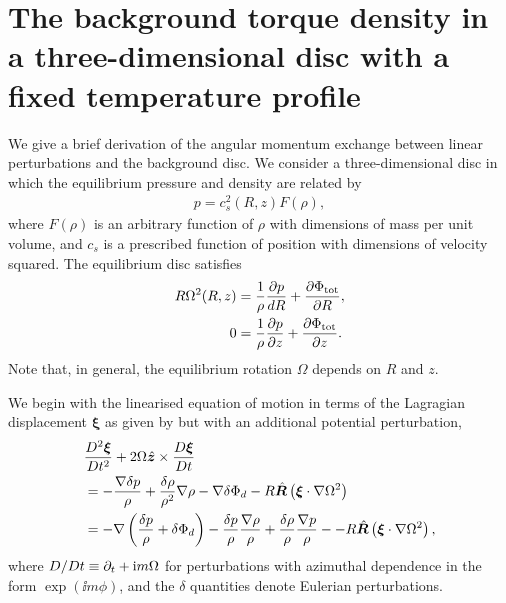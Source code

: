 \section{The background torque density in a three-dimensional disc with
  a fixed temperature profile}\label{tbg_deriv}
We give a brief derivation of the angular momentum exchange between
linear perturbations and the background disc. We consider a
three-dimensional disc in which the equilibrium pressure and density
are related by 
\begin{align}\label{iso_cond}
  p = c_s^2(R,z)F(\rho),
\end{align} 
where $F(\rho)$ is an arbitrary function of $\rho$ with dimensions of
mass per unit volume, and $c_s$ is a prescribed function of
position with dimensions of velocity squared. The equilibrium disc
satisfies 
\begin{align}
  R\Omega^2(R,z) &= \frac{1}{\rho}\frac{\partial p}{d R} +
  \frac{\partial\Phi_\mathrm{tot}}{\partial R}, \\
  0 &= \frac{1}{\rho}\frac{\partial p}{\partial z} + \frac{\partial\Phi_\mathrm{tot}}{\partial
    z}. 
\end{align}
Note that, in general, the equilibrium rotation $\Omega$ depends on
$R$ and $z$. 

We begin with the linearised equation of motion in terms of the
Lagragian displacement $\bm{\xi}$ as given by \cite{lin93b} but with an
additional potential perturbation, 
\begin{align}\label{lagragian_pert}
  &\frac{D^2\bm{\xi}}{Dt^2} +
  2\Omega\hat{\bm{z}}\times\frac{D\bm{\xi}}{Dt}  \notag \\ &= -
  \frac{\nabla \delta p }{\rho} + \frac{\delta\rho}{\rho^2}\nabla\rho  
  -\nabla\delta\Phi_d - R
  \hat{\bm{R}}\left(\bm{\xi}\cdot\nabla\Omega^2\right) \notag \\
  & = -\nabla\left(\frac{\delta p}{\rho} + \delta \Phi_d\right) -
  \frac{\delta p}{\rho}\frac{\nabla\rho}{\rho} +
  \frac{\delta\rho}{\rho}\frac{\nabla p}{\rho} - - R
  \hat{\bm{R}}\left(\bm{\xi}\cdot\nabla\Omega^2\right),
\end{align}
where $D/Dt \equiv \partial_t + \mathrm{i} m \Omega$ for perturbations with
azimuthal dependence in the form $\exp\left(\ii m \phi\right)$, and  
the $\delta$ quantities denote Eulerian perturbations. 

